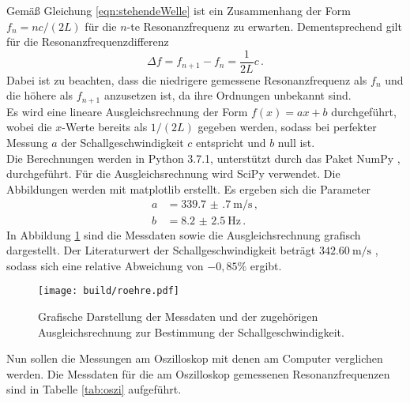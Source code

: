 Gemäß Gleichung \eqref{eqn:stehendeWelle} ist ein Zusammenhang der Form $f_n = nc/(2 L)$
für die $n$-te Resonanzfrequenz zu erwarten. Dementsprechend gilt für die Resonanzfrequenzdifferenz
\begin{equation}
	\Delta f = f_{n+1} - f_n = \frac{1}{2L} c\,.
	\label{eqn:deltaf}
\end{equation}
Dabei ist zu beachten, dass die niedrigere gemessene Resonanzfrequenz als $f_n$ und die höhere als $f_{n+1}$ anzusetzen ist, da ihre Ordnungen unbekannt sind.\\
Es wird eine lineare Ausgleichsrechnung der Form $f(x)=ax+b$ durchgeführt, wobei die $x$-Werte bereits als $1/(2L)$ gegeben werden, sodass bei perfekter Messung $a$ der Schallgeschwindigkeit $c$ entspricht und $b$ null ist.\\
Die Berechnungen werden in Python 3.7.1, unterstützt durch das Paket NumPy \cite{numpy}, durchgeführt.
Für die Ausgleichsrechnung wird SciPy \cite{scipy} verwendet. Die Abbildungen werden mit matplotlib \cite{matplotlib} erstellt. Es ergeben sich die Parameter
\begin{align*}
  a&=\SI{339.7(7)}{\meter\per\second}\,, \\
  b&=\SI{8.2(25)}{\Hz}\,.
\end{align*}
In Abbildung \ref{fig:roehre} sind die Messdaten sowie die Ausgleichsrechnung grafisch
dargestellt.
Der Literaturwert der Schallgeschwindigkeit beträgt $\SI{342.60}{\meter\per\second}$ \cite{Schallgeschwindigkeit}, sodass sich eine relative Abweichung von $-0{,}85\%$ ergibt.

\begin{figure}[h!]
  \centering
  \texttt{[image: build/roehre.pdf]}
  \caption{Grafische Darstellung der Messdaten und der zugehörigen Ausgleichsrechnung
  zur Bestimmung der Schallgeschwindigkeit.}
  \label{fig:roehre}
\end{figure}

Nun sollen die Messungen am Oszilloskop mit denen am Computer verglichen werden.
Die Messdaten für die am Oszilloskop gemessenen Resonanzfrequenzen sind in Tabelle \ref{tab:oszi} aufgeführt.

